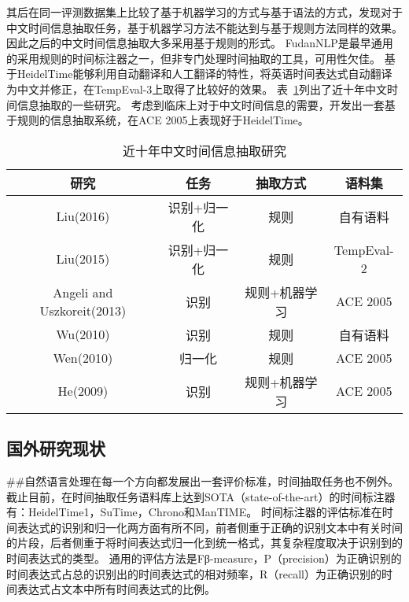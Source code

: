 其后\citet{wu2005normalizing}在同一评测数据集上比较了基于机器学习的方式与基于语法的方式，发现对于中文时间信息抽取任务，基于机器学习方法不能达到与基于规则方法同样的效果。因此之后的中文时间信息抽取大多采用基于规则的形式。
FudanNLP\cite{qiu2013fudannlp}是最早通用的采用规则的时间标注器之一，但非专门处理时间抽取的工具，可用性欠佳。
\citet{li2014chinese}基于HeidelTime能够利用自动翻译和人工翻译的特性，将英语时间表达式自动翻译为中文并修正，在TempEval-3上取得了比较好的效果。
表~\ref{tab:research}列出了近十年中文时间信息抽取的一些研究。
\citet{liu2016cmedtex}考虑到临床上对于中文时间信息的需要，开发出一套基于规则的信息抽取系统，在ACE 2005上表现好于HeidelTime。

\begin{table}[h]
    \centering
    \caption{近十年中文时间信息抽取研究}
    \begin{tabular}{*{4}{c}}
        \toprule
        研究      & 任务        & 抽取方式 & 语料集   \\
        \midrule
        Liu(2016) & 识别+归一化 & 规则     & 自有语料 \\
        Liu(2015) & 识别+归一化 & 规则 & TempEval-2 \\
        Angeli and Uszkoreit(2013) & 识别 & 规则+机器学习 & ACE 2005 \\
        Wu(2010) & 识别 & 规则 & 自有语料 \\
        Wen(2010) & 归一化 & 规则 & ACE 2005\\
        He(2009) & 识别 & 规则+机器学习 & ACE 2005\\
        \bottomrule
    \end{tabular}
    \label{tab:research}
\end{table}


\subsection{国外研究现状}

##自然语言处理在每一个方向都发展出一套评价标准，时间抽取任务也不例外。
截止目前，在时间抽取任务语料库上达到SOTA（state-of-the-art）的时间标注器有：HeidelTime1\cite{strotgen2010heideltime}，SuTime\cite{chang2012sutime}，Chrono\cite{olex2018chrono}和ManTIME\cite{filannino2013mantime}。
时间标注器的评估标准在时间表达式的识别和归一化两方面有所不同，前者侧重于正确的识别文本中有关时间的片段，后者侧重于将时间表达式归一化到统一格式，其复杂程度取决于识别到的时间表达式的类型。
通用的评估方法是Fβ-measure，P（precision）为正确识别的时间表达式占总的识别出的时间表达式的相对频率，R（recall）为正确识别的时间表达式占文本中所有时间表达式的比例。

